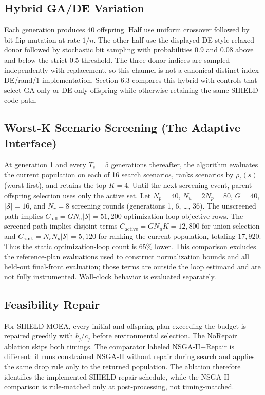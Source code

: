 \documentclass[energies,article,submit,moreauthors]{Definitions/mdpi}
\begin{document}
\subsection{Hybrid GA/DE Variation}\label{hybrid-gade-variation}

Each generation produces 40 offspring. Half use uniform crossover followed by bit-flip mutation at rate \(1/n\). The other half use the displayed DE-style relaxed donor followed by stochastic bit sampling with probabilities 0.9 and 0.08 above and below the strict 0.5 threshold. The three donor indices are sampled independently with replacement, so this channel is not a canonical distinct-index DE/rand/1 implementation. Section 6.3 compares this hybrid with controls that select GA-only or DE-only offspring while otherwise retaining the same SHIELD code path.

\subsection{Worst-K Scenario Screening (The Adaptive Interface)}\label{worst-k-scenario-screening-the-adaptive-interface}

At generation 1 and every \(T_s = 5\) generations thereafter, the algorithm evaluates the current population on each of 16 search scenarios, ranks scenarios by \(\rho_t(s)\) (worst first), and retains the top \(K = 4\). Until the next screening event, parent--offspring selection uses only the active set. Let \(N_p=40\), \(N_u=2N_p=80\), \(G=40\), \(|\mathcal S|=16\), and \(N_r=8\) screening rounds (generations 1, 6, \ldots, 36). The unscreened path implies \(C_{\mathrm{full}}=G N_u|\mathcal S|=51{,}200\) optimization-loop objective rows. The screened path implies disjoint terms \(C_{\mathrm{active}}=G N_uK=12{,}800\) for union selection and \(C_{\mathrm{rank}}=N_rN_p|\mathcal S|=5{,}120\) for ranking the current population, totaling \(17{,}920\). Thus the static optimization-loop count is 65\% lower. This comparison excludes the reference-plan evaluations used to construct normalization bounds and all held-out final-front evaluation; those terms are outside the loop estimand and are not fully instrumented. Wall-clock behavior is evaluated separately.

\subsection{Feasibility Repair}\label{feasibility-repair}

For SHIELD-MOEA, every initial and offspring plan exceeding the budget is repaired greedily with \(b_j/c_j\) before environmental selection. The NoRepair ablation skips both timings. The comparator labeled NSGA-II+Repair is different: it runs constrained NSGA-II without repair during search and applies the same drop rule only to the returned population. The ablation therefore identifies the implemented SHIELD repair schedule, while the NSGA-II comparison is rule-matched only at post-processing, not timing-matched.
\end{document}
